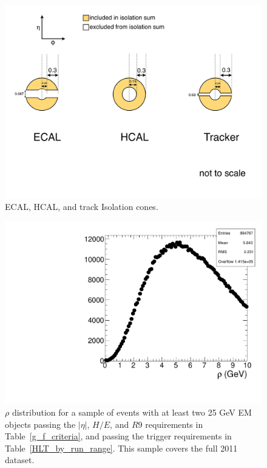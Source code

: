 \documentclass[dissertation.tex]{subfiles}
\begin{document}
\begin{figure}
	\centering
	\includegraphics[scale=0.25]{isolation_cones}
	\caption{ECAL, HCAL, and track Isolation cones.}
	\label{fig:isolation_cones}
\end{figure}

\begin{figure}
	\centering
	\includegraphics[scale=0.25]{preselected_rho}
	\caption{$\rho$ distribution for a sample of events with at least two 25 GeV EM objects passing the $|\eta|$, $H/E$, and $R9$ requirements in Table~\ref{g_f_criteria}, and passing the trigger requirements in Table~\ref{HLT_by_run_range}.  This sample covers the full 2011 dataset.}
	\label{fig:preselected_rho}
\end{figure}
\end{document}
